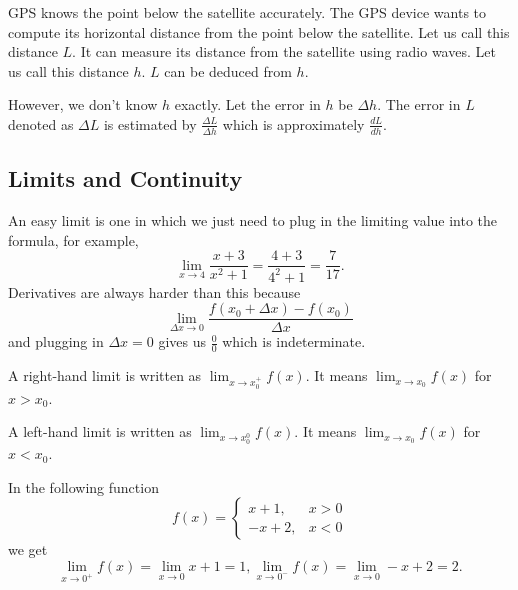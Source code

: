 \begin{example}
GPS knows the point below the satellite accurately. The GPS device wants
to compute its horizontal distance from the point below the satellite.
Let us call this distance \( L \). It can measure its distance from the
satellite using radio waves. Let us call this distance \( h \). \( L \)
can be deduced from \( h \).

However, we don't know \( h \) exactly. Let the error in \( h \) be \(
\Delta h \). The error in \( L \) denoted as \( \Delta L \) is estimated
by \( \frac{\Delta L}{\Delta h} \) which is approximately \(
\frac{dL}{dh} \).
\end{example}


\subsection{Limits and Continuity}

An easy limit is one in which we just need to plug in the limiting value
into the formula, for example,
\[
    \lim_{x \to 4} \frac{x + 3}{x^2 + 1}
        = \frac{4 + 3}{4^2 + 1}
        = \frac{7}{17}.
\]
Derivatives are always harder than this because
\[
    \lim_{\Delta x \to 0} \frac{f(x_0 + \Delta x) - f(x_0)}{\Delta x}
\]
and plugging in \( \Delta x = 0 \) gives us \( \frac{0}{0} \) which is
indeterminate.

A right-hand limit is written as \( \lim_{x \to x_0^+} f(x) \). It means
\( \lim_{x \to x_0} f(x) \) for \( x > x_0 \).

A left-hand limit is written as \( \lim_{x \to x_0^0} f(x) \). It means
\( \lim_{x \to x_0} f(x) \) for \( x < x_0 \).

\begin{example}
In the following function
\[
    f(x) =
        \begin{cases}
            x + 1,  & x > 0 \\
            -x + 2, & x < 0
        \end{cases}
\]
we get
\[
    \lim_{x \to 0^+} f(x) = \lim_{x \to 0} x + 1 = 1,
    \lim_{x \to 0^-} f(x) = \lim_{x \to 0} -x + 2 = 2.
\]
\end{example}
